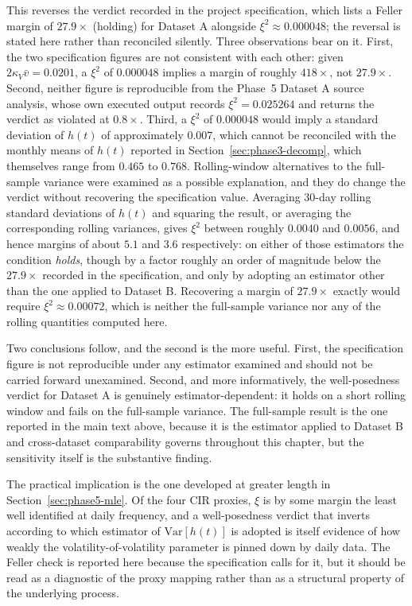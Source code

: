 This reverses the verdict recorded in the project specification, which lists a Feller margin of $27.9\times$ (holding) for Dataset A alongside $\xi^2 \approx 0.000048$; the reversal is stated here rather than reconciled silently. Three observations bear on it. First, the two specification figures are not consistent with each other: given $2\kappa_V\bar v = 0.0201$, a $\xi^2$ of $0.000048$ implies a margin of roughly $418\times$, not $27.9\times$. Second, neither figure is reproducible from the Phase~5 Dataset A source analysis, whose own executed output records $\xi^2 = 0.025264$ and returns the verdict as violated at $0.8\times$. Third, a $\xi^2$ of $0.000048$ would imply a standard deviation of $h(t)$ of approximately $0.007$, which cannot be reconciled with the monthly means of $h(t)$ reported in Section~\ref{sec:phase3-decomp}, which themselves range from $0.465$ to $0.768$. Rolling-window alternatives to the full-sample variance were examined as a possible explanation, and they do change the verdict without recovering the specification value. Averaging 30-day rolling standard deviations of $h(t)$ and squaring the result, or averaging the corresponding rolling variances, gives $\xi^2$ between roughly $0.0040$ and $0.0056$, and hence margins of about $5.1$ and $3.6$ respectively: on either of those estimators the condition \emph{holds}, though by a factor roughly an order of magnitude below the $27.9\times$ recorded in the specification, and only by adopting an estimator other than the one applied to Dataset B. Recovering a margin of $27.9\times$ exactly would require $\xi^2 \approx 0.00072$, which is neither the full-sample variance nor any of the rolling quantities computed here.

Two conclusions follow, and the second is the more useful. First, the specification figure is not reproducible under any estimator examined and should not be carried forward unexamined. Second, and more informatively, the well-posedness verdict for Dataset A is genuinely estimator-dependent: it holds on a short rolling window and fails on the full-sample variance. The full-sample result is the one reported in the main text above, because it is the estimator applied to Dataset B and cross-dataset comparability governs throughout this chapter, but the sensitivity itself is the substantive finding.

The practical implication is the one developed at greater length in Section~\ref{sec:phase5-mle}. Of the four CIR proxies, $\xi$ is by some margin the least well identified at daily frequency, and a well-posedness verdict that inverts according to which estimator of $\mathrm{Var}[h(t)]$ is adopted is itself evidence of how weakly the volatility-of-volatility parameter is pinned down by daily data. The Feller check is reported here because the specification calls for it, but it should be read as a diagnostic of the proxy mapping rather than as a structural property of the underlying process.

